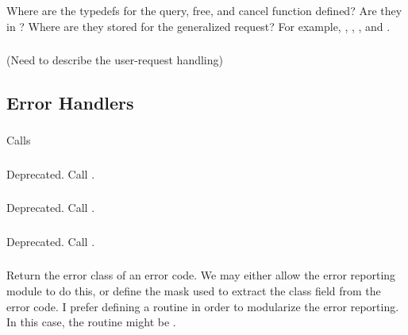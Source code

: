 \documentclass{article}
\begin{document}
\subsubsection{}
Where are the typedefs for the query, free, and cancel function defined? 
Are they in ?  Where are they stored for the generalized request?
For example, ,
,
, and
. 

\subsubsection{}

(Need to describe the user-request handling)

\subsection{Error Handlers}

\subsubsection{}
Calls 

\subsubsection{}
Deprecated.  Call .

\subsubsection{}
Deprecated.  Call .

\subsubsection{}
Deprecated.  Call .

\subsubsection{}
Return the error class of an error code.  We may either allow the
error reporting module to do this, or define the mask used to extract
the class field from the error code.  I prefer defining a routine in
order to modularize the error reporting.  In this case, the routine
might be .
\end{document}
